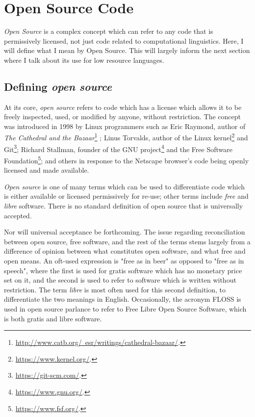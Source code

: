 \section{Open Source Code}
\label{sec:open-source}

{\it Open Source} is a complex concept which can refer to any code that is permissively licensed, not just code related to computational linguistics. Here, I will define what I mean by Open Source. This will largely inform the next section where I talk about its use for low resource languages.

\subsection{Defining {\it open source}}
\label{subsec:defining-open-source}

At its core, {\it open source} refers to code which has a license which allows it to be freely inspected, used, or modified by anyone, without restriction. The concept was introduced in 1998 by Linux programmers such as Eric Raymond, author of {\it The Cathedral and the Bazaar}\footnote{\href{http://www.catb.org/~esr/writings/cathedral-bazaar/}{http://www.catb.org/~esr/writings/cathedral-bazaar/}. } \citep{raymond1999cathedral}; Linus Torvalds, author of the Linux kernel\footnote{\href{https://www.kernel.org/}{https://www.kernel.org/}. } and Git\footnote{\href{https://git-scm.com/}{https://git-scm.com/}. }; Richard Stallman, founder of the GNU project\footnote{\href{https://www.gnu.org/}{https://www.gnu.org/}. } and the Free Software Foundation\footnote{\href{https://www.fsf.org/}{https://www.fsf.org/}. }; and others in response to the Netscape browser's code being openly licensed and made available.

{\it Open source} is one of many terms which can be used to differentiate code which is either available or licensed permissively for re-use; other terms include {\it free} and {\it libre} software. There is no standard definition of open source that is universally accepted.

Nor will universal acceptance be forthcoming. The issue regarding reconciliation between open source, free software, and the rest of the terms stems largely from a difference of opinion between what constitutes open software, and what free and open means. An oft-used expression is "free as in beer" as opposed to "free as in speech", where the first is used for gratis software which has no monetary price set on it, and the second is used to refer to software which is written without restriction. The term {\it libre} is most often used for this second definition, to differentiate the two meanings in English. Occasionally, the acronym FLOSS is used in open source parlance to refer to Free Libre Open Source Software, which is both gratis and libre software.

